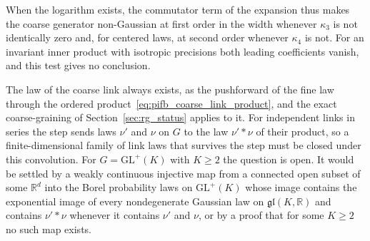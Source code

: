 When the logarithm exists, the commutator term of the expansion thus makes the coarse generator non-Gaussian at first order in the width whenever $\kappa_3$ is not identically zero and, for centered laws, at second order whenever $\kappa_4$ is not. For an invariant inner product with isotropic precisions both leading coefficients vanish, and this test gives no conclusion.

\begin{remark}\label{rem:llp_open_coarse}
The law of the coarse link always exists, as the pushforward of the fine law through the ordered product~\eqref{eq:pifb_coarse_link_product}, and the exact coarse-graining of Section~\ref{sec:rg_status} applies to it. For independent links in series the step sends laws $\nu'$ and $\nu$ on $G$ to the law $\nu'*\nu$ of their product, so a finite-dimensional family of link laws that survives the step must be closed under this convolution. For $G=\mathrm{GL}^+(K)$ with $K\geq2$ the question is open. It would be settled by a weakly continuous injective map from a connected open subset of some $\mathbb R^d$ into the Borel probability laws on $\mathrm{GL}^+(K)$ whose image contains the exponential image of every nondegenerate Gaussian law on $\mathfrak{gl}(K,\mathbb R)$ and contains $\nu'*\nu$ whenever it contains $\nu'$ and $\nu$, or by a proof that for some $K\geq2$ no such map exists.
\end{remark}
